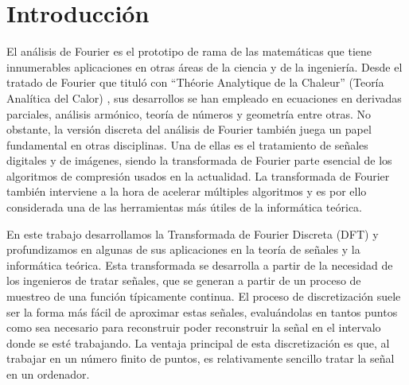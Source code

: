 \documentclass{article}
\begin{document}
\hypersetup{pageanchor=false}
\maketitle
\hypersetup{pageanchor=true}


\setcounter{tocdepth}{2}

\newpage
\tableofcontents
\vspace*{\fill}
\doclicenseThis
\newpage


\section{Introducción}
El análisis de Fourier es el prototipo de rama de las matemáticas que tiene innumerables aplicaciones en otras áreas de la ciencia y de la ingeniería. Desde el tratado de Fourier que tituló con “Théorie Analytique de la Chaleur” (Teoría Analítica del Calor) \cite{fourier}, sus desarrollos se han empleado en ecuaciones en derivadas parciales, análisis armónico, teoría de números y geometría entre otras. No obstante, la versión discreta del análisis de Fourier también juega un papel fundamental en otras disciplinas. Una de ellas es el tratamiento de señales digitales y de imágenes, siendo la transformada de Fourier parte esencial de los algoritmos de compresión usados en la actualidad. La transformada de Fourier también interviene a la hora de acelerar múltiples algoritmos y es por ello considerada una de las herramientas más útiles de la informática teórica.

En este trabajo desarrollamos la Transformada de Fourier Discreta (DFT) y profundizamos en algunas de sus aplicaciones en la teoría de señales y la informática teórica. Esta transformada se desarrolla a partir de la necesidad de los ingenieros de tratar señales, que se generan a partir de un proceso de muestreo de una función típicamente continua. El proceso de discretización suele ser la forma más fácil de aproximar estas señales, evaluándolas en tantos puntos como sea necesario para reconstruir poder reconstruir la señal en el intervalo donde se esté trabajando. La ventaja principal de esta discretización es que, al trabajar en un número finito de puntos, es relativamente sencillo tratar la señal en un ordenador. 
\end{document}
